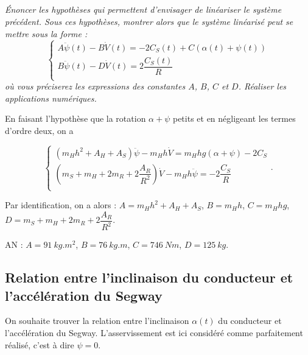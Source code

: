 \documentclass[10pt,fleqn]{article} %
\begin{document}

\subparagraph{\label{q_20}}\textit{\'Enoncer les hypothèses qui permettent d’envisager de linéariser le système précédent. Sous ces hypothèses, montrer alors que le système linéarisé peut se mettre sous la forme :}
$$
\left\{
\begin{array}{l}
A \ddot{\psi}(t) - B \dot{V}(t) = - 2C_S(t)+C\left(\alpha(t) + \psi(t)\right) \\
B \ddot{\psi}(t) - D \dot{V}(t) = 2\dfrac{C_S(t)}{R} \\\end{array}
\right.
$$
\textit{où vous préciserez les expressions des constantes $A$, $B$, $C$ et $D$. Réaliser les applications numériques.}
\ifprof
\begin{corrige}
En faisant l'hypothèse que la rotation $\alpha+\psi$ petits et en négligeant les termes d'ordre deux, on a 

$$
\left\{
\begin{array}{l}
\left( m_H h^2 +A_H + A_S\right)\ddot{\psi} - m_H h \dot{V}  = m_H hg \left(\alpha + \psi\right) - 2C_S \\
\left( m_S +m_H + 2m_R + 2\dfrac{A_R}{R^2}\right)\dot{V} - m_H h \ddot{\psi} =  - 2\dfrac{C_S}{R}  \\
\end{array}
\right. .
$$

Par identification, on a alors : $A= m_H h^2 +A_H + A_S$, $B = m_H h$, $C= m_H hg$, $D= m_S +m_H + 2m_R + 2\dfrac{A_R}{R^2}$.

AN : $A=\SI{91}{kg.m^2}$, $B=\SI{76}{kg.m}$, $C=\SI{746}{Nm}$, $D=\SI{125}{kg}$.
\end{corrige}
\else
\fi


\subsection{Relation entre l’inclinaison du conducteur et l’accélération du Segway}

On souhaite trouver la relation entre l’inclinaison $\alpha(t)$ du conducteur et l’accélération du Segway. L’asservissement est ici considéré comme parfaitement réalisé, c’est à dire $\psi=0$.
\end{document}
